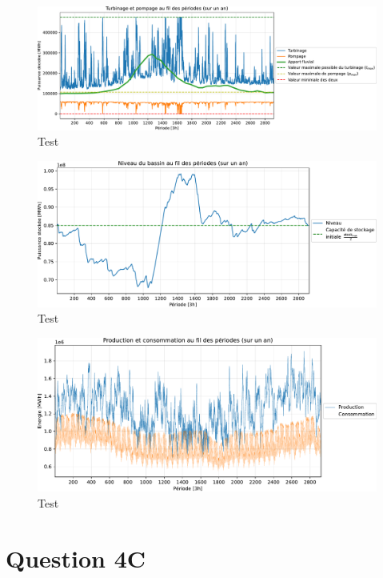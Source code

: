 \documentclass{article}
\begin{document}
\begin{figure}[h!]
    \centering
    \includegraphics[scale=0.6]{GraphesP2/Turbinage_pompage_Q4.pdf}
    \caption{Test}
    \label{fig:Turbinage_pompage_Q4}
\end{figure}
\begin{figure}[h!]
    \centering
    \includegraphics[scale=0.6]{GraphesP2/Niveau_Bassin_Q4.pdf}
    \caption{Test}
    \label{fig:Niveau_bassin_Q4}
\end{figure}
\begin{figure}[h!]
    \centering
    \includegraphics[scale=0.6]{GraphesP2/Prod_Cons_Q4.pdf}
    \caption{Test}
    \label{fig:Prod_Cons_Q4}
\end{figure}


\clearpage
\section*{Question 4C}
\end{document}
